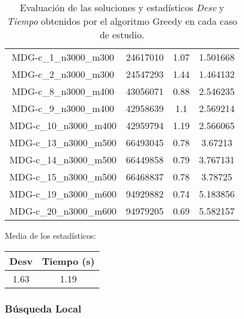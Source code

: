 \documentclass{article}
\begin{document}
\begin{table}[H]
\begin{tabular}{|cccc|}
		MDG-c\_1\_n3000\_m300 & 24617010 & 1.07 & 1.501668\\
		MDG-c\_2\_n3000\_m300 & 24547293 & 1.44 & 1.464132\\
		MDG-c\_8\_n3000\_m400 & 43056071 & 0.88 & 2.546235\\
		MDG-c\_9\_n3000\_m400 & 42958639 & 1.1 & 2.569214\\
		MDG-c\_10\_n3000\_m400 & 42959794 & 1.19 & 2.566065\\
		MDG-c\_13\_n3000\_m500 & 66493045 & 0.78 & 3.67213\\
		MDG-c\_14\_n3000\_m500 & 66449858 & 0.79 & 3.767131\\
		MDG-c\_15\_n3000\_m500 & 66468837 & 0.78 & 3.78725\\
		MDG-c\_19\_n3000\_m600 & 94929882 & 0.74 & 5.183856\\
		MDG-c\_20\_n3000\_m600 & 94979205 & 0.69 & 5.582157\\
		\hline
	\end{tabular}
	\caption{Evaluación de las soluciones y estadísticos \emph{Desv} y \emph{Tiempo} obtenidos por el algoritmo Greedy
		en cada caso de estudio.}
	\label{tab:greedy}
\end{table}

Media de los estadísticos:
\begin{table}[H]
	\centering
	\begin{tabular}{|cc|}
		\hline
		Desv & Tiempo (s)\\ \hline
		1.63 & 1.19 \\
		\hline
	\end{tabular}
\end{table}

\pagebreak

\subsubsection*{Búsqueda Local}
\end{document}

